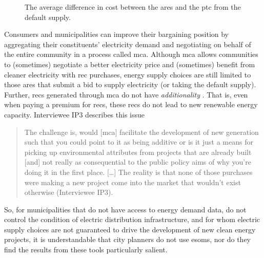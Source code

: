 \begin{figure}[ht!]
    \centering
    \resizebox{0.9\columnwidth}{!}{}
    \caption{The average difference in cost between the \ac{ares} and the
    \ac{ptc} from the default supply.}
    \label{fig:ares-ptc}
\end{figure}

Consumers and municipalities can improve their bargaining position by
aggregating their constituents' electricity demand and negotiating on behalf of
the entire community in a process called \acf{mca}. Although \ac{mca} allows
communities to (sometimes) negotiate a better electricity price and (sometimes)
benefit from cleaner electricity with \ac{rec} purchases, energy supply choices
are still limited to those \ac{ares} that submit a bid to supply electricity (or
taking the default supply). Further, \acp{rec} generated through \ac{mca} do not
have \textit{additionality} \cite{illinois_power_agency_municipal_2023}. That
is, even when paying a premium for \acp{rec}, these \acp{rec} do not lead to new
renewable energy capacity. Interviewee IP3 describes this issue
\begin{quote}
     The challenge is, would [\ac{mca}] facilitate the development of new
     generation such that you could point to it as being additive or is it just
     a means for picking up environmental attributes from projects that are
     already built [and] not really as consequential to the public policy aims
     of why you're doing it in the first place. [\dots] The reality is that none
     of those purchases were making a new project come into the market that
     wouldn't exist otherwise (Interviewee IP3).
\end{quote}

So, for municipalities that do not have access to energy demand data, do not
control the condition of electric distribution infrastructure, and for whom
electric supply choices are not guaranteed to drive the development of new clean
energy projects, it is understandable that city planners do not use \acp{esom},
nor do they find the results from these tools particularly salient. 

